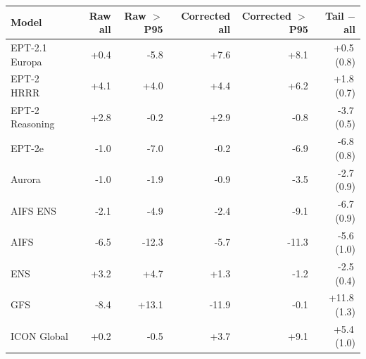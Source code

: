 \begin{tabular}{@{}lrrrrr@{}}
\toprule
Model & Raw all & Raw $>$P95 & Corrected all & Corrected $>$P95 & Tail $-$ all \\
\midrule
EPT-2.1 Europa & +0.4 & -5.8 & +7.6 & +8.1 & +0.5\,(0.8) \\
EPT-2 HRRR & +4.1 & +4.0 & +4.4 & +6.2 & +1.8\,(0.7) \\
EPT-2 Reasoning & +2.8 & -0.2 & +2.9 & -0.8 & -3.7\,(0.5) \\
EPT-2e & -1.0 & -7.0 & -0.2 & -6.9 & -6.8\,(0.8) \\
Aurora & -1.0 & -1.9 & -0.9 & -3.5 & -2.7\,(0.9) \\
AIFS ENS & -2.1 & -4.9 & -2.4 & -9.1 & -6.7\,(0.9) \\
AIFS & -6.5 & -12.3 & -5.7 & -11.3 & -5.6\,(1.0) \\
ENS & +3.2 & +4.7 & +1.3 & -1.2 & -2.5\,(0.4) \\
GFS & -8.4 & +13.1 & -11.9 & -0.1 & +11.8\,(1.3) \\
ICON Global & +0.2 & -0.5 & +3.7 & +9.1 & +5.4\,(1.0) \\
\bottomrule
\end{tabular}
